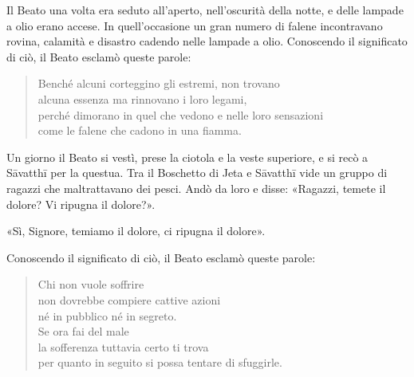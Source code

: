 

 Il Beato una volta era seduto all’aperto, nell’oscurità
della notte, e delle lampade a olio erano accese. In quell’occasione un
gran numero di falene incontravano rovina, calamità e disastro cadendo
nelle lampade a olio. Conoscendo il significato di ciò, il Beato esclamò
queste parole:


\begin{quote}
Benché alcuni corteggino gli estremi, non trovano \\
alcuna essenza ma rinnovano i loro legami, \\
perché dimorano in quel che vedono e nelle loro sensazioni \\
come le falene che cadono in una fiamma.
\end{quote}



Un giorno il Beato si vestì, prese la ciotola e la veste superiore, e si
recò a Sāvatthī per la questua. Tra il Boschetto di Jeta e Sāvatthī vide
un gruppo di ragazzi che maltrattavano dei pesci. Andò da loro e disse:
«Ragazzi, temete il dolore? Vi ripugna il dolore?».


«Sì, Signore, temiamo il dolore, ci ripugna il dolore».


Conoscendo il significato di ciò, il Beato esclamò queste parole:


\begin{quote}
Chi non vuole soffrire \\
non dovrebbe compiere cattive azioni \\
né in pubblico né in segreto. \\
Se ora fai del male \\
la sofferenza tuttavia certo ti trova \\
per quanto in seguito si possa tentare di sfuggirle.
\end{quote}



